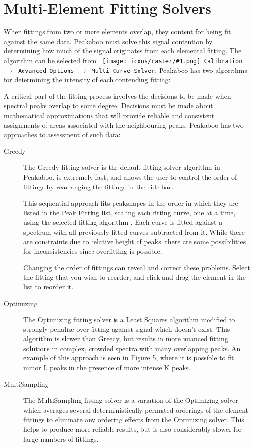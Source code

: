 \documentclass[article,twoside,11pt]{report}
\newcommand{\command}[1]{\texttt{#1}}
\newcommand{\icon}[1]{\texttt{[image: icons/raster/\#1.png]}}
\newcommand{\button}[2]{\ \command{\icon{#1} #2}}
\newcommand{\menu}[0]{$\rightarrow$}
\newcommand{\tocsection}[1]{\section*{#1}\addcontentsline{toc}{section}{#1}}
\begin{document}
\tocsection{Multi-Element Fitting Solvers}

When fittings from two or more elements overlap, they content for being fit against the same data. Peakaboo must solve this signal contention by determining how much of the signal originates from each elemental fitting. The algorithm can be selected from \command{\button{energy-menu}{Calibration} \menu\ Advanced Options \menu\ Multi-Curve Solver}. Peakaboo has two algorithms for determining the intensity of each contending fitting:

A critical part of the fitting process involves the decisions to be made when spectral peaks overlap to some degree. Decisions must be made about mathematical approximations that will provide reliable and consistent assignments of areas associated with the neighbouring peaks. Peakaboo has two approaches to assessment of such data: 





\begin{description}

\item [Greedy] The Greedy fitting solver is the default fitting solver algorithm in Peakaboo. is extremely fast, and allows the user to control the order of fittings by rearranging the fittings in the side bar. 

This sequential approach fits peakshapes in the order in which they are listed in the Peak Fitting list, scaling each fitting curve, one at a time, using the selected fitting algorithm . Each curve is fitted against a spectrum with all previously fitted curves subtracted from it. While there are constraints due to relative height of peaks, there are some possibilities for inconsistencies since overfitting is possible. 

Changing the order of fittings can reveal and correct these problems. Select the fitting that you wish to reorder, and click-and-drag the element in the list to reorder it.


\item [Optimizing] The Optimizing fitting solver is a Least Squares algorithm modified to strongly penalize over-fitting against signal which doesn't exist. This algorithm is slower than Greedy, but results in more nuanced fitting solutions in complex, crowded spectra with many overlapping peaks. An example of this approach is seen in Figure 5, where it is possible to fit minor L peaks in the presence of more intense K peaks.

\item [MultiSampling] The MultiSampling fitting solver is a variation of the Optimizing solver which averages several deterministically permuted orderings of the element fittings to eliminate any ordering effects from the Optimizing solver. This helps to produce more reliable results, but is also considerably slower for large numbers of fittings.

\end{description}
\end{document}

